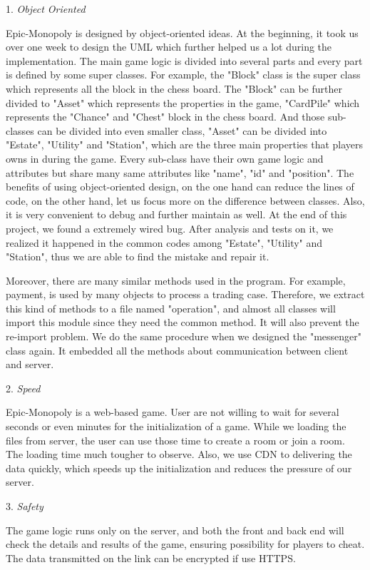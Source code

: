 \documentclass[a4paper,11pt]{article}
\begin{document}
1.	\emph{Object Oriented}
 
Epic-Monopoly is designed by object-oriented ideas. At the beginning, it took us over one week to design the UML which further helped us a lot during the implementation. The main game logic is divided into several parts and every part is defined by some super classes. For example, the "Block" class is the super class which represents all the block in the chess board. The "Block" can be further divided to "Asset" which represents the properties in the game, "CardPile" which represents the "Chance" and "Chest" block in the chess board. And those sub-classes can be divided into even smaller class, "Asset" can be divided into "Estate", "Utility" and "Station", which are the three main properties that players owns in during the game. Every sub-class have their own game logic and attributes but share many same attributes like "name", "id" and "position". The benefits of using object-oriented design, on the one hand can reduce the lines of code, on the other hand, let us focus more on the difference between classes. Also, it is very convenient to debug and further maintain as well. At the end of this project, we found a extremely wired bug. After analysis and tests on it, we realized it happened in the common codes among "Estate", "Utility" and "Station", thus we are able to find the mistake and repair it.

Moreover, there are many similar methods used in the program. For example, payment, is used by many objects to process a trading case. Therefore, we extract this kind of methods to a file named "operation", and almost all classes will import this module since they need the common method. It will also prevent the re-import problem. We do the same procedure when we designed the "messenger" class again. It embedded all the methods about communication between client and server.

2.	\emph{Speed}

Epic-Monopoly is a web-based game. User are not willing to wait for several seconds or even minutes for the initialization of a game. While we loading the files from server, the user can use those time to create a room or join a room. The loading time much tougher to observe. Also, we use CDN to delivering the data quickly, which speeds up the initialization and reduces the pressure of our server.

3.	\emph{Safety}

The game logic runs only on the server, and both the front and back end will check the details and results of the game, ensuring possibility for players to cheat. The data transmitted on the link can be encrypted if use HTTPS.
\end{document}
